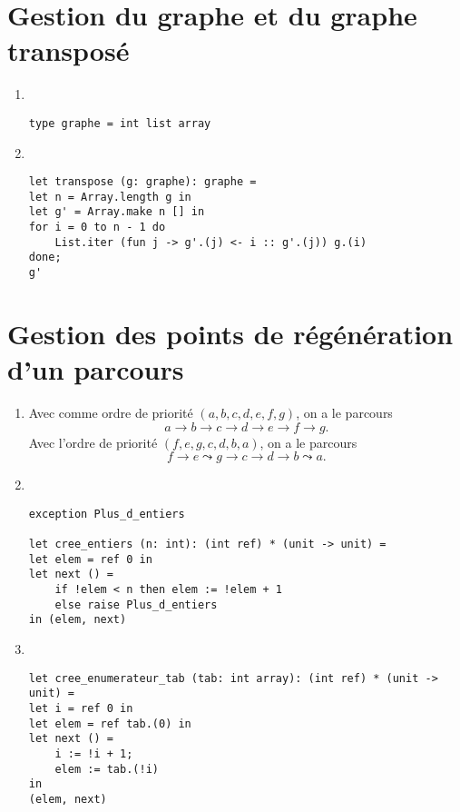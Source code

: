 \section{Gestion du graphe et du graphe transposé}
\begin{enumerate}
	\item~
		\begin{lstlisting}[language=caml,caption=Type \texttt{graphe}]
type graphe = int list array
		\end{lstlisting}
	\item~
		\begin{lstlisting}[language=caml,caption=Transposée d'un graphe]
let transpose (g: graphe): graphe =
let n = Array.length g in
let g' = Array.make n [] in
for i = 0 to n - 1 do
	List.iter (fun j -> g'.(j) <- i :: g'.(j)) g.(i)
done;
g'
		\end{lstlisting}
\end{enumerate}
\section{Gestion des points de régénération d’un parcours}
\begin{enumerate}[start=3]
	\item Avec comme ordre de priorité $(a, b, c, d, e, f, g)$, on a le parcours
		\[
			a \to b \to c \to d \to e \to f \to g
		.\]
		Avec l'ordre de priorité $(f, e, g, c, d, b, a)$, on a le parcours \[
			f \to e \leadsto g \to c \to d \to b \leadsto a
		.\]
	\item~
		\begin{lstlisting}[language=caml,caption={Générateur du tableau $\llbracket 0,\texttt{n} \rrbracket$}]
exception Plus_d_entiers

let cree_entiers (n: int): (int ref) * (unit -> unit) =
let elem = ref 0 in
let next () =
	if !elem < n then elem := !elem + 1
	else raise Plus_d_entiers
in (elem, next)
		\end{lstlisting}
	\item~
		\begin{lstlisting}[language=caml,caption={Générateur d'un tableau \texttt{tab}}]
let cree_enumerateur_tab (tab: int array): (int ref) * (unit -> unit) =
let i = ref 0 in
let elem = ref tab.(0) in
let next () =
	i := !i + 1;
	elem := tab.(!i)
in
(elem, next)
		\end{lstlisting}
\end{enumerate}
